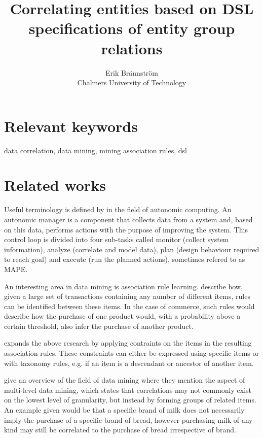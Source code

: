\documentclass[a4paper]{article}
\begin{document}
\title{Correlating entities based on DSL specifications of entity group relations}
\author{Erik Brännström\\
  Chalmers University of Technology}
\date{}
\maketitle

\section{Relevant keywords}
data correlation, data mining, mining association rules, dsl

\section{Related works}
Useful terminology is defined by \citet{IBM2006} in the field of autonomic computing. An autonomic manager is a component that
collects data from a system and, based on this data, performs actions with the purpose of improving the system. This control
loop is divided into four sub-tasks called monitor (collect system information), analyze (correlate and model data), plan
(design behaviour required to reach goal) and execute (run the planned actions), sometimes refered to as MAPE.

An interesting area in data mining is association rule learning. \citet{Agrawal1993} describe how, given a large set of
transactions containing any number of different items, rules can be identified between these items. In the case of commerce,
such rules would describe how the purchase of one product would, with a probability above a certain threshold, also infer
the purchase of another product.

\citet{Srikant1997} expands the above research by applying contraints on the items in the resulting association rules. These
constraints can either be expressed using specific items or with taxonomy rules, e.g. if an item is a descendant or ancestor
of another item.

\citet{Chen1996} give an overview of the field of data mining where they mention the aspect of multi-level data mining, which
states that correlations may not commonly exist on the lowest level of granularity, but instead by forming groups of related
items. An example given would be that a specific brand of milk does not necessarily imply the purchase of a specific brand of
bread, however purchasing milk of any kind may still be correlated to the purchase of bread irrespective of brand.
\end{document}
